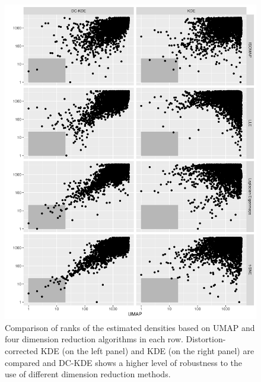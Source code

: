 \documentclass[
]{article}
\begin{document}
\begin{figure}

{\centering \includegraphics[width=0.9\linewidth]{figures/Electricity_2d_rankplot_3639id_umapvs4ml_radius20_r180} 

}

\caption{Comparison of ranks of the estimated densities based on UMAP and four dimension reduction algorithms in each row. Distortion-corrected KDE (on the left panel) and KDE (on the right panel) are compared and DC-KDE shows a higher level of robustness to the use of different dimension reduction methods.}\label{fig:electricityrank}
\end{figure}
\end{document}
